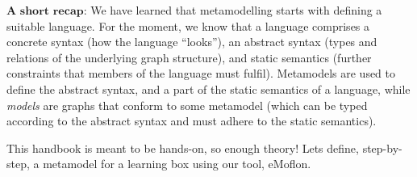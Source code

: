 $\textbf{A short recap:}$ We have learned that metamodelling starts with defining a suitable language. For the moment, we know that a language comprises a
concrete syntax (how the language ``looks''),  an abstract syntax (types and relations of the underlying graph structure), and static semantics (further
constraints that members of the language must fulfil). Metamodels are used to define the abstract syntax, and a part of the static semantics of a language,
while \emph{models} are graphs that conform to some metamodel (which can be typed according to the abstract syntax and must adhere to the static
semantics).

This handbook is meant to be hands-on, so enough theory! Lets define, step-by-step, a metamodel for a learning box using our tool, eMoflon.

